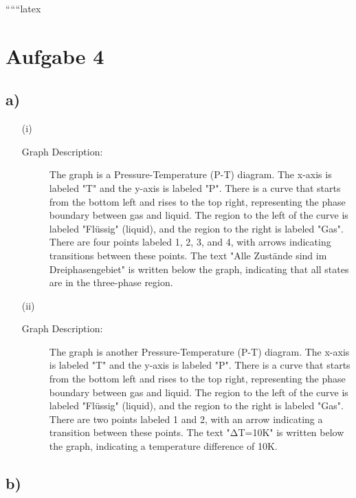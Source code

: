 
``````latex


\section*{Aufgabe 4}

\subsection*{a)}

\begin{itemize}
    \item[(i)] 
    \begin{description}
        \item[Graph Description:] The graph is a Pressure-Temperature (P-T) diagram. The x-axis is labeled "T" and the y-axis is labeled "P". There is a curve that starts from the bottom left and rises to the top right, representing the phase boundary between gas and liquid. The region to the left of the curve is labeled "Flüssig" (liquid), and the region to the right is labeled "Gas". There are four points labeled 1, 2, 3, and 4, with arrows indicating transitions between these points. The text "Alle Zustände sind im Dreiphasengebiet" is written below the graph, indicating that all states are in the three-phase region.
    \end{description}
    
    \item[(ii)] 
    \begin{description}
        \item[Graph Description:] The graph is another Pressure-Temperature (P-T) diagram. The x-axis is labeled "T" and the y-axis is labeled "P". There is a curve that starts from the bottom left and rises to the top right, representing the phase boundary between gas and liquid. The region to the left of the curve is labeled "Flüssig" (liquid), and the region to the right is labeled "Gas". There are two points labeled 1 and 2, with an arrow indicating a transition between these points. The text "ΔT=10K" is written below the graph, indicating a temperature difference of 10K.
    \end{description}
\end{itemize}

\subsection*{b)}

